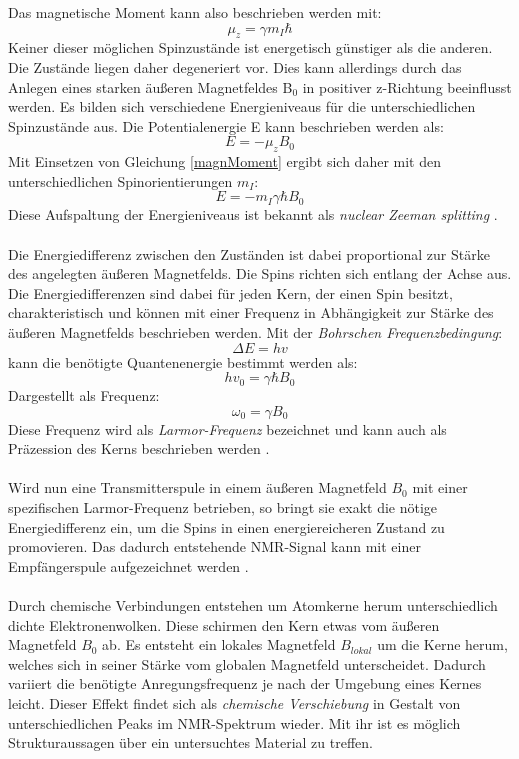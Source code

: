 \documentclass[a4paper, 11pt, headsepline,footsepline,twoside,abstract]{scrbook}
\begin{document}
Das magnetische Moment kann also beschrieben werden mit:
\begin{equation}
\mu_z = \gamma m_I \hbar
\end{equation}
Keiner dieser möglichen Spinzustände ist energetisch günstiger als die anderen. Die Zustände liegen daher degeneriert vor. Dies kann allerdings durch das Anlegen eines starken äußeren Magnetfeldes B$_0$ in positiver z-Richtung beeinflusst werden. Es bilden sich verschiedene Energieniveaus für die unterschiedlichen Spinzustände aus. Die Potentialenergie E kann beschrieben werden als:
\begin{equation}
E = -\mu_z B_0
\end{equation}
Mit Einsetzen von Gleichung \ref{magnMoment} ergibt sich daher mit den unterschiedlichen Spinorientierungen $m_I$:
\begin{equation}
E = -m_I \gamma \hbar B_0
\label{energiezustaende}
\end{equation}
Diese Aufspaltung der Energieniveaus ist bekannt als \textit{nuclear Zeeman splitting} \cite{Guenther2013}. 
\\\\
Die Energiedifferenz zwischen den Zuständen ist dabei proportional zur Stärke des angelegten äußeren Magnetfelds. Die Spins richten sich entlang der Achse aus. Die Energiedifferenzen sind dabei für jeden Kern, der einen Spin besitzt, charakteristisch und können mit einer Frequenz in Abhängigkeit zur Stärke des äußeren Magnetfelds beschrieben werden. Mit der \textit{Bohrschen Frequenzbedingung}\cite{Gerthsen2015}:
\begin{equation}
\Delta E = hv
\end{equation}
kann die benötigte Quantenenergie bestimmt werden als: %
\begin{equation}
hv_0 = \gamma \hbar B_0
\end{equation}
Dargestellt als Frequenz:
\begin{equation}
\omega_0 = \gamma B_0
\end{equation}
Diese Frequenz wird als \textit{Larmor-Frequenz} bezeichnet und kann auch als Präzession des Kerns beschrieben werden \cite{Guenther2013}. 
\\\\
Wird nun eine Transmitterspule in einem äußeren Magnetfeld $B_0$ mit einer spezifischen Larmor-Frequenz betrieben, so bringt sie exakt die nötige Energiedifferenz ein, um die Spins in einen energiereicheren Zustand zu promovieren. Das dadurch entstehende NMR-Signal kann mit einer Empfängerspule aufgezeichnet werden \cite{Friebolin2011}.
\\\\
Durch chemische Verbindungen entstehen um Atomkerne herum unterschiedlich dichte Elektronenwolken. Diese schirmen den Kern etwas vom äußeren Magnetfeld $B_0$ ab. Es entsteht ein lokales Magnetfeld $B_{lokal}$ um die Kerne herum, welches sich in seiner Stärke vom globalen Magnetfeld unterscheidet. Dadurch variiert die benötigte Anregungsfrequenz je nach der Umgebung eines Kernes leicht. Dieser Effekt findet sich als \textit{chemische Verschiebung} in Gestalt von unterschiedlichen Peaks im NMR-Spektrum wieder. Mit ihr ist es möglich Strukturaussagen über ein untersuchtes Material zu treffen.
\end{document}
